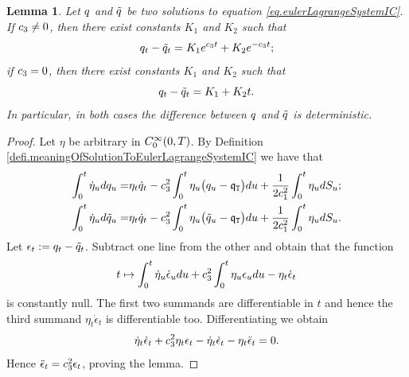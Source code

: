 \documentclass[10pt,a4paper]{article}
\newtheorem{lemma}[thm]{Lemma}
\begin{document}
	\begin{lemma}
		\label{lemma.twoSolutionsEulerLagrangeIC}
		Let $q$ and $\tilde{q}$ be two solutions to equation \eqref{eq.eulerLagrangeSystemIC}. If $c_{3} \neq 0 $, then there exist constants $K_1$ and $K_2$ such that 
		\begin{equation*}
		q_t - \tilde{q}_t = K_1 e^{c_{3} t } + K_2 e^{-c_{3} t};
		\end{equation*}
		if $c_{3}=0$, then there exist constants $K_1$ and $K_2$ such that 
		\begin{equation*}
		q_t - \tilde{q}_t = K_1  + K_2 t.
		\end{equation*}
		In particular, in both cases the difference between $q$  and $\tilde{q}$ is deterministic. 
	\end{lemma}
	\begin{proof}
		Let $\eta$ be arbitrary in $C^{\infty}_{0}(0,T)$. By Definition \ref{defi.meaningOfSolutionToEulerLagrangeSystemIC} we have that 
		\begin{equation*}
		\begin{split}
		\int_{0}^{t} \dot{\eta}_u dq_u 
		=& \eta_t \dot{q}_{t}  
		 - c_{3}^{2} 	\int_{0}^{t} \eta_u \big(q_u  - \mathfrak{q}_{\mathtt{T} }\big) du 
		+ \frac{1}{2c_{1}^{2}} 	\int_{0}^{t} \eta_{u} dS_u ; \\
		\int_{0}^{t} \dot{\eta}_u d\tilde{q}_u 
		=& \eta_t \dot{q}_{t}  
		 - c_{3}^{2} 	\int_{0}^{t} \eta_u \big(\tilde{q}_u  - \mathfrak{q}_{\mathtt{T} }\big) du 
		+ \frac{1}{2c_{1}^{2}} 	\int_{0}^{t} \eta_{u} dS_u .
		\end{split}
		\end{equation*}
		Let $\epsilon_t:= q_t - \tilde{q}_t$. Subtract one line from the other and obtain that the function 
		\begin{equation*}
		t\mapsto \int_{0}^{t} \dot{\eta}_u \dot{\epsilon}_u du + c_{3}^{2} \int_{0}^{t} \eta_u \epsilon_u du - \eta_t \dot{\epsilon}_t 
		\end{equation*}
		is constantly null. The first two summands are differentiable in $t$ and hence the third summand $ \eta_t \dot{\epsilon}_t $ is differentiable too. Differentiating we obtain
		\begin{equation*}
		 \dot{\eta}_t \dot{\epsilon}_t + c_{3}^{2} \eta_t \epsilon_t - \dot{\eta}_t \dot{\epsilon}_t  - \eta_t \ddot{\epsilon}_t = 0.
		\end{equation*}
		Hence $\ddot{\epsilon}_t = c_{3}^{2} \epsilon_t$, proving the lemma. 
	\end{proof}
\end{document}
